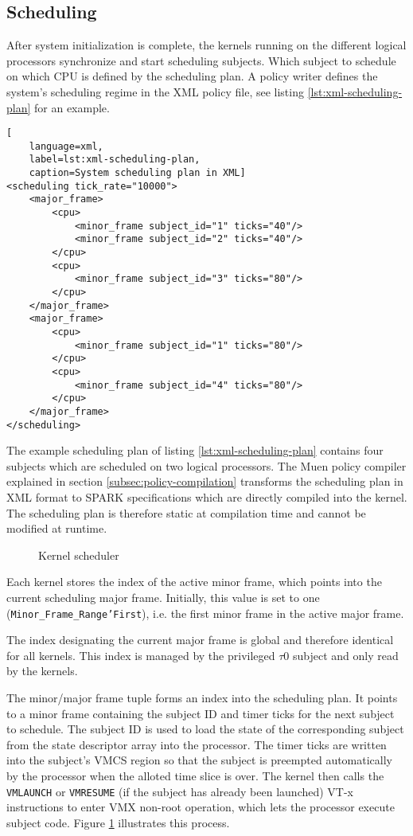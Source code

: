 \subsection{Scheduling}\label{subsec:scheduling}
After system initialization is complete, the kernels running on the different
logical processors synchronize and start scheduling subjects. Which subject to
schedule on which CPU is defined by the scheduling plan. A policy writer defines
the system's scheduling regime in the XML policy file, see listing
\ref{lst:xml-scheduling-plan} for an example.

\begin{lstlisting}[
	language=xml,
	label=lst:xml-scheduling-plan,
	caption=System scheduling plan in XML]
<scheduling tick_rate="10000">
	<major_frame>
		<cpu>
			<minor_frame subject_id="1" ticks="40"/>
			<minor_frame subject_id="2" ticks="40"/>
		</cpu>
		<cpu>
			<minor_frame subject_id="3" ticks="80"/>
		</cpu>
	</major_frame>
	<major_frame>
		<cpu>
			<minor_frame subject_id="1" ticks="80"/>
		</cpu>
		<cpu>
			<minor_frame subject_id="4" ticks="80"/>
		</cpu>
	</major_frame>
</scheduling>
\end{lstlisting}

The example scheduling plan of listing \ref{lst:xml-scheduling-plan} contains
four subjects which are scheduled on two logical processors. The Muen policy
compiler explained in section \ref{subsec:policy-compilation} transforms the
scheduling plan in XML format to SPARK specifications which are directly
compiled into the kernel. The scheduling plan is therefore static at compilation
time and cannot be modified at runtime.

\begin{figure}[h]
	\centering
	
	\caption{Kernel scheduler}
	\label{fig:kernel-scheduler}
\end{figure}

Each kernel stores the index of the active minor frame, which points into the
current scheduling major frame. Initially, this value is set to one
(\texttt{Minor\_Frame\_Range'First}), i.e. the first minor frame in the active
major frame.

The index designating the current major frame is global and therefore identical
for all kernels. This index is managed by the privileged $\tau$0 subject and
only read by the kernels.

The minor/major frame tuple forms an index into the scheduling plan. It points
to a minor frame containing the subject ID and timer ticks for the next subject
to schedule. The subject ID is used to load the state of the corresponding
subject from the state descriptor array into the processor. The timer ticks are
written into the subject's VMCS region so that the subject is preempted
automatically by the processor when the alloted time slice is over. The kernel
then calls the \texttt{VMLAUNCH} or \texttt{VMRESUME} (if the subject has
already been launched) VT-x instructions to enter VMX non-root operation, which
lets the processor execute subject code. Figure \ref{fig:kernel-scheduler}
illustrates this process.

